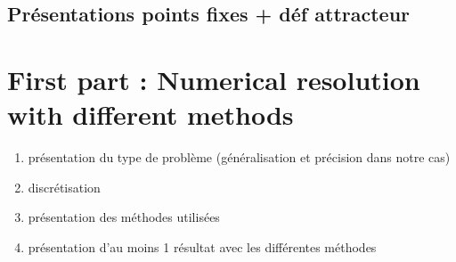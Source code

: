 \documentclass[12pt]{article}
\begin{document}
	\subsection{ Présentations points fixes + déf attracteur}
	
	\section{First part : Numerical resolution with different methods}
	
	\begin{enumerate}[label=\textbullet]
		\item présentation du type de problème (généralisation et précision dans notre cas)
		\item discrétisation
		\item présentation des méthodes utilisées
		\item présentation d'au moins 1 résultat avec les différentes méthodes
	\end{enumerate}
\end{document}
